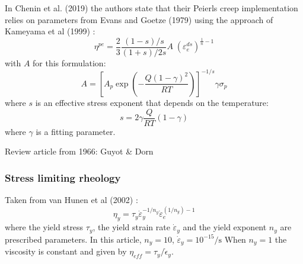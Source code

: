 In Chenin et al. (2019) \cite{chmd19} the authors state that their Peierls creep implementation
relies on parameters from Evans and Goetze (1979) \cite{evgo79} using the approach of 
Kameyama et al (1999) \cite{kayk99}:
\[
\eta^{pe}=\frac{2}{3} \frac{(1-s)/s}{(1+s)/2s} A \; (\varepsilon_e^{ds})^{\frac{1}{n}-1} 
\]
with $A$ for this formulation:
\[
A = \left[ A_p \exp \left( -\frac{Q(1-\gamma)^2}{RT} \right)  \right]^{-1/s} \gamma \sigma_p
\]
where $s$ is an effective stress exponent that depends on the temperature:
\[
s = 2 \gamma \frac{Q}{RT} (1-\gamma)
\]
where $\gamma$ is a fitting parameter. 


\Literature \cite{basv06,buro11,faff11,gagd14,gery10,goev79,kaka08,kako09,kary01,mesk10,zhwa13,chsm18,shwl17}
Review article from 1966: Guyot \& Dorn \cite{gudo67}


\subsubsection{Stress limiting rheology}

Taken from van Hunen et al (2002) \cite{vavv02}:
\[
\eta_y = \tau_y \dot{\varepsilon}_y^{-1/n_y} \dot{\varepsilon}_e^{(1/n_y) -1 } 
\]
where the yield stress $\tau_y$, the yield strain rate $\dot{\varepsilon}_y$ and the yield exponent $n_y$ are
prescribed parameters. In this article, $n_y=10$, $\dot{\varepsilon}_y=10^{-15}\si{\per\second}$
When $n_y=1$ the viscosity is constant and given by $\eta_{eff} = \tau_y / \dot{\epsilon}_y$.

